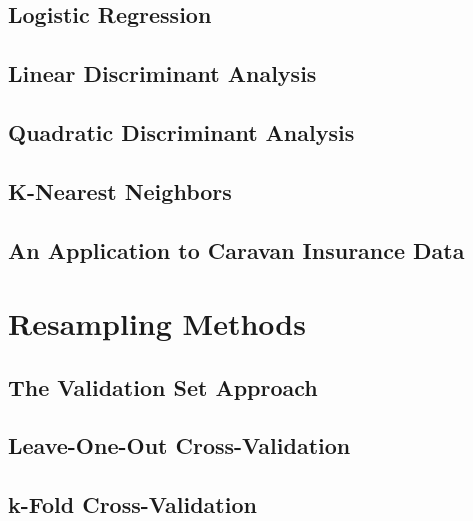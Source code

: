 \documentclass[
]{book}
\begin{document}
\hypertarget{logistic-regression}{%
\section{Logistic Regression}\label{logistic-regression}}

\hypertarget{linear-discriminant-analysis}{%
\section{Linear Discriminant Analysis}\label{linear-discriminant-analysis}}

\hypertarget{quadratic-discriminant-analysis}{%
\section{Quadratic Discriminant Analysis}\label{quadratic-discriminant-analysis}}

\hypertarget{k-nearest-neighbors}{%
\section{K-Nearest Neighbors}\label{k-nearest-neighbors}}

\hypertarget{an-application-to-caravan-insurance-data}{%
\section{An Application to Caravan Insurance Data}\label{an-application-to-caravan-insurance-data}}

\hypertarget{resampling-methods}{%
\chapter{Resampling Methods}\label{resampling-methods}}

\hypertarget{the-validation-set-approach}{%
\section{The Validation Set Approach}\label{the-validation-set-approach}}

\hypertarget{leave-one-out-cross-validation}{%
\section{Leave-One-Out Cross-Validation}\label{leave-one-out-cross-validation}}

\hypertarget{k-fold-cross-validation}{%
\section{k-Fold Cross-Validation}\label{k-fold-cross-validation}}
\end{document}
